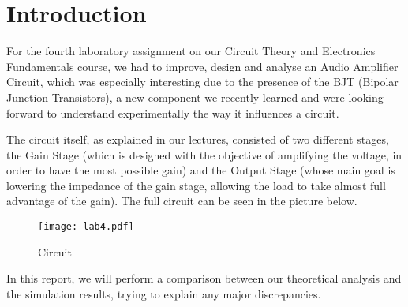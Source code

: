 \section{Introduction}

For the fourth laboratory assignment on our Circuit Theory and Electronics Fundamentals course, we had to improve, design and analyse an Audio Amplifier Circuit, which was especially interesting due to the presence of the BJT (Bipolar Junction Transistors), a new component we recently learned and were looking forward to understand experimentally the way it influences a circuit.

The circuit itself, as explained in our lectures, consisted of two different stages, the Gain Stage (which is designed with the objective of amplifying the voltage, in order to have the most possible gain) and the Output Stage (whose main goal is lowering the impedance of the gain stage, allowing the load to take almost full advantage of the gain). The full circuit can be seen in the picture below.

\begin{figure}[ht] \centering
\texttt{[image: lab4.pdf]}
\caption{Circuit}
\label{fig:circ}
\end{figure}

\par
In this report, we will perform a comparison between our theoretical analysis and the simulation results, trying to explain any major discrepancies.


\clearpage


